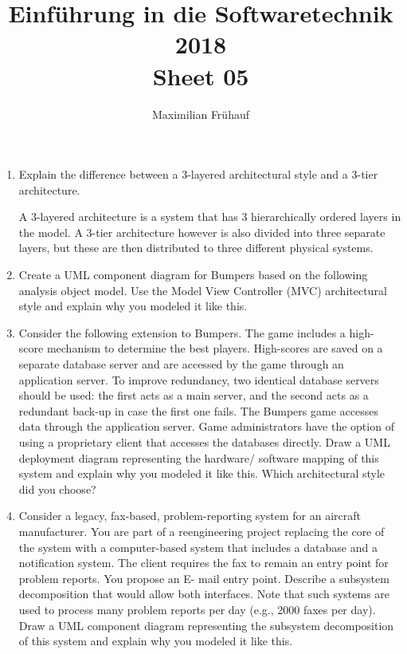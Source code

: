 \documentclass[a4paper, 10pt]{article}
\title{Einführung in die Softwaretechnik 2018 \\ Sheet 05}
\author{Maximilian Frühauf}
\begin{document}
\maketitle
\begin{enumerate}
    \item
    Explain the difference between a 3-layered architectural style and a 3-tier architecture.
    \vspace{0.5cm}

    A 3-layered architecture is a system that has 3 hierarchically ordered layers in the model.
    A 3-tier architecture however is also divided into three separate layers, but these are then 
    distributed to three different physical systems.
    \item
    Create a UML component diagram for Bumpers based on the following analysis object model. 
    Use the Model View Controller (MVC) architectural style and explain why you modeled it like this.
    \vspace{0.5cm}
    \item
    Consider the following extension to Bumpers. 
    The game includes a high- score mechanism to determine the best players. 
    High-scores are saved on a separate database server and are accessed by the game through an 
    application server. To improve redundancy, two identical database servers should be used: 
    the first acts as a main server, and the second acts as a redundant back-up in case the 
    first one fails. The Bumpers game accesses data through the application server. 
    Game administrators have the option of using a proprietary client that accesses the databases 
    directly. Draw a UML deployment diagram representing the hardware/ software mapping of this 
    system and explain why you modeled it like this. Which architectural style did you choose?
    \vspace{0.5cm}
    \item
    Consider a legacy, fax-based, problem-reporting system for an aircraft manufacturer. 
    You are part of a reengineering project replacing the core of the system with a 
    computer-based system that includes a database and a notification system. 
    The client requires the fax to remain an entry point for problem reports. 
    You propose an E- mail entry point. Describe a subsystem decomposition that would allow 
    both interfaces. Note that such systems are used to process many problem reports per 
    day (e.g., 2000 faxes per day). Draw a UML component diagram representing the 
    subsystem decomposition of this system and explain why you modeled it like this.
    \vspace{0.5cm}
\end{enumerate}
\end{document}
